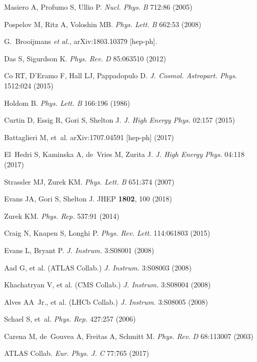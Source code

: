 \documentclass{ar-1col}
\begin{document}
\begin{thebibliography}{175}
Masiero A, Profumo S, Ullio P. \textit{Nucl. Phys.} \textit{B} 712:86 (2005)

Pospelov M, Ritz A, Voloshin MB. \textit{Phys. Lett.} \textit{B} 662:53
(2008)

  G.~Brooijmans {\it et al.}, arXiv:1803.10379 [hep-ph].
  
Das S, Sigurdson K. \textit{Phys. Rev.} \textit{D} 85:063510 (2012)

Co RT, D'Eramo F, Hall LJ, Pappadopulo D. \textit{J. Cosmol. Astropart. Phys.} 1512:024
(2015)

Holdom B. \textit{Phys. Lett. B} 166:196 (1986)

Curtin D, Essig R, Gori S, Shelton J. \textit{J. High Energy Phys.} 02:157 (2015)

Battaglieri M, et~al. arXiv:1707.04591 [hep-ph] (2017)

El~Hedri S, Kaminska A, de~Vries M, Zurita J. \textit{J. High Energy Phys.} 04:118
(2017)

Strassler MJ, Zurek KM. \textit{Phys. Lett.} \textit{B} 651:374 (2007)

Evans JA, Gori S, Shelton J. JHEP {\bf 1802}, 100 (2018)

Zurek KM. \textit{Phys. Rep.} 537:91 (2014)

Craig N, Knapen S, Longhi P. \textit{Phys. Rev. Lett.} 114:061803
(2015)

Evans L, Bryant P. \textit{{J. Instrum.}} 3:{S08001} (2008)

{{Aad G, et al. (ATLAS Collab.)}} \textit{{J. Instrum.}} 3:{S08003} (2008)

{{Khachatryan V, et al. (CMS Collab.)}} \textit{{J. Instrum.}} 3:{S08004} (2008)

{{Alves AA\ Jr., et al. (LHCb Collab.)}} \textit{{J. Instrum.}} 3:{S08005} (2008)

Schael S, et~al. \textit{Phys. Rep.} 427:257 (2006)

Carena M, de~Gouvea A, Freitas A, Schmitt M. \textit{Phys. Rev.}
\textit{D} 68:113007 (2003)

{ATLAS Collab.} \textit{Eur. Phys. J.} \textit{C} 77:765 (2017)


\end{thebibliography}
\end{document}
